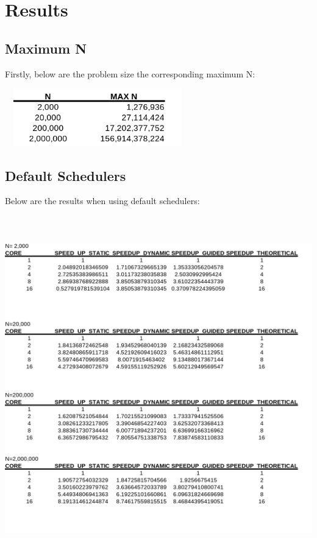 \documentclass[12pt]{article}
\begin{document}
        \newpage
        \section{Results}
        \subsection{Maximum N }
        Firstly, below are the problem size the corresponding maximum N:

        \begin{center}	
            \includegraphics[width = 80mm,height = 25mm]{result_max.png}
        \end{center}
    
        \subsection{Default Schedulers}
        Below are the results when using default schedulers: 

        \begin{center}	
            \includegraphics[width = 150mm,height = 150mm]{result_speed.png}
        \end{center}
\end{document}
